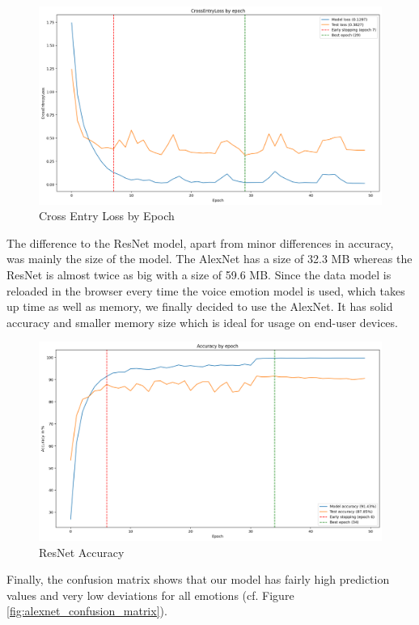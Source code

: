 \begin{figure}
\centering
\includegraphics[width=1\textwidth]{assets/alexnet_loss.png}
\caption{Cross Entry Loss by Epoch}
\label{fig:alexnet_loss}
\end{figure}

The difference to the ResNet model, apart from minor differences in accuracy, was mainly the size of the model. The AlexNet has a size of 32.3 MB whereas the ResNet is almost twice as big with a size of 59.6 MB. Since the data model is reloaded in the browser every time the voice emotion model is used, which takes up time as well as memory, we finally decided to use the AlexNet. It has solid accuracy and smaller memory size which is ideal for usage on end-user devices.

\begin{figure}
\centering
\includegraphics[width=1\textwidth]{assets/resnet_accuracy.png}
\caption{ResNet Accuracy}
\label{fig:resnet_accuracy}
\end{figure}

Finally, the confusion matrix shows that our model has fairly high prediction values and very low deviations for all emotions (cf. Figure \ref{fig:alexnet_confusion_matrix}).

